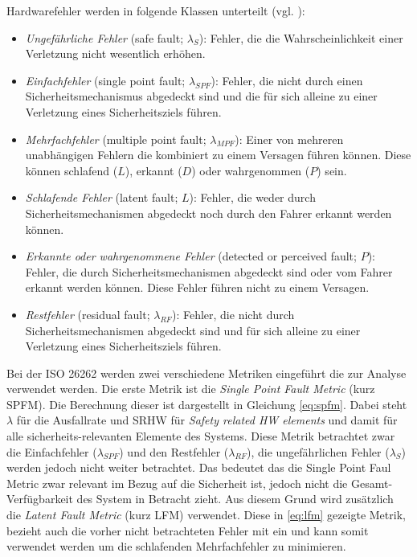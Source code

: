 \documentclass[a4paper,DIV=calc,ngerman]{scrartcl}
\begin{document}
Hardwarefehler werden in folgende Klassen unterteilt (vgl. \cite[S. 136]{1}):
\begin{itemize}
    \item \emph{Ungefährliche Fehler} (safe fault; $ \lambda_S $): Fehler, die die Wahrscheinlichkeit einer Verletzung nicht wesentlich erhöhen.
    \item \emph{Einfachfehler} (single point fault; $ \lambda_{SPF} $): Fehler, die nicht durch einen Sicherheitsmechanismus abgedeckt sind und die für sich alleine zu einer Verletzung eines Sicherheitsziels führen.
    \item \emph{Mehrfachfehler} (multiple point fault; $ \lambda_{MPF} $): Einer von mehreren unabhängigen Fehlern die kombiniert zu einem Versagen führen können. Diese können schlafend ($L$), erkannt ($D$) oder wahrgenommen ($P$) sein.
    \item \emph{Schlafende Fehler} (latent fault; $ L $): Fehler, die weder durch Sicherheitsmechanismen abgedeckt noch durch den Fahrer erkannt werden können.
    \item \emph{Erkannte oder wahrgenommene Fehler} (detected or perceived fault; $ P $): Fehler, die durch Sicherheitsmechanismen abgedeckt sind oder vom Fahrer erkannt werden können. Diese Fehler führen nicht zu einem Versagen.
    \item \emph{Restfehler} (residual fault; $ \lambda_{RF} $): Fehler, die nicht durch Sicherheitsmechanismen abgedeckt sind und für sich alleine zu einer Verletzung eines Sicherheitsziels führen.
\end{itemize}

Bei der ISO 26262 werden zwei verschiedene Metriken eingeführt die zur Analyse verwendet werden. Die erste Metrik ist die \emph{Single Point Fault Metric} (kurz SPFM). Die Berechnung dieser ist dargestellt in Gleichung \ref{eq:spfm}. Dabei steht $ \lambda $ für die Ausfallrate und SRHW für \emph{Safety related HW elements} und damit für alle sicherheits-relevanten Elemente des Systems. Diese Metrik betrachtet zwar die Einfachfehler ($ \lambda_{SPF} $) und den Restfehler ($ \lambda_{RF} $), die ungefährlichen Fehler ($ \lambda_{S} $) werden jedoch nicht weiter betrachtet. Das bedeutet das die Single Point Faul Metric zwar relevant im Bezug auf die Sicherheit ist, jedoch nicht die Gesamt-Verfügbarkeit des System in Betracht zieht. Aus diesem Grund wird zusätzlich die \emph{Latent Fault Metric} (kurz LFM) verwendet. Diese in \ref{eq:lfm} gezeigte Metrik, bezieht auch die vorher nicht betrachteten Fehler mit ein und kann somit verwendet werden um die schlafenden Mehrfachfehler zu minimieren. 
\end{document}
